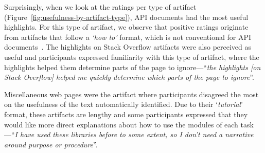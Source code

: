 Surprisingly, when we look at the ratings per type of artifact (Figure~\ref{fig:usefulness-by-artifact-type}), API documents had the most useful highlights.
For this type of artifact, we observe that positive ratings originate from artifacts that follow a \textit{`how to'} format,
which is not conventional for API documents~\cite{robillard2011field, arya2020}. The highlights on Stack Overflow artifacts were also perceived as useful
and participants expressed familiarity with this type of artifact, where the highlights helped them determine parts of the page to ignore---``\textit{the highlights [on Stack Overflow] helped me quickly determine which parts of the page to ignore}''.



Miscellaneous web pages were the artifact where participants disagreed the most on the usefulness of the text automatically identified.
Due to their `\textit{tutorial}' format, these artifacts are lengthy and some participants expressed that they would like more direct explanations about how to use the modules of each task---``\textit{I have used these libraries before to some extent, so I don't need a narrative around purpose or procedure}''. 























% 













